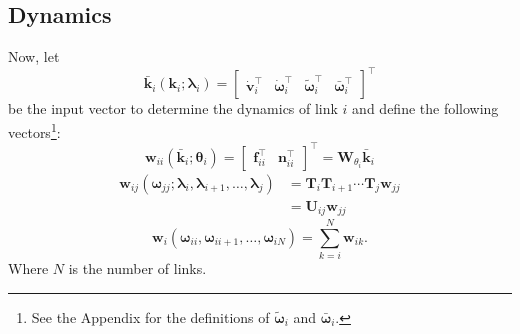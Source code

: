 \subsection{Dynamics}
Now, let 
\begin{equation}
\bar{\bm{k}}_i(\bm{k}_i;\bm{\lambda}_i)= \begin{bmatrix} \dot{\bm{v}}^\intercal_i & \dot{\bm{\omega}}^\intercal_i & \tilde{\bm{\omega}}^\intercal_i & \bar{\bm{\omega}}^\intercal_i\end{bmatrix}^\intercal
\end{equation}
be the input vector to determine the dynamics of link $i$ and define the following vectors\footnote{See the Appendix for the definitions of $\tilde{\bm{\omega}}_i$ and $\bar{\bm{\omega}}_i$.}:
\begin{equation}
\bm{w}_{ii}(\bar{\bm{k}}_{i};\bm{\theta}_i)=\begin{bmatrix}
\bm{f}^\intercal_{ii} & \bm{n}^\intercal_{ii}
\end{bmatrix}^\intercal =\bm{W}_{\theta_i}\bar{\bm{k}}_{i}
\label{eq:self_wrench}
\end{equation}
\begin{align}
\bm{w}_{ij}(\bm{\omega}_{jj};\bm{\lambda}_{i},\bm{\lambda}_{i+1},\ldots,\bm{\lambda}_{j})& = \bm{T}_i\bm{T}_{i+1}\cdots\bm{T}_j\bm{w}_{jj} \nonumber \\&=\bm{U}_{ij}\bm{w}_{jj}
\label{eq:ext_wrench}
\end{align}
\begin{equation}
\bm{w}_{i}(\bm{\omega}_{ii},\bm{\omega}_{ii+1},\ldots,\bm{\omega}_{iN})= \sum_{k=i}^{N} \bm{w}_{ik} .
\label{eq:wrench_link_i}
\end{equation}
Where $N$ is the number of links. 

